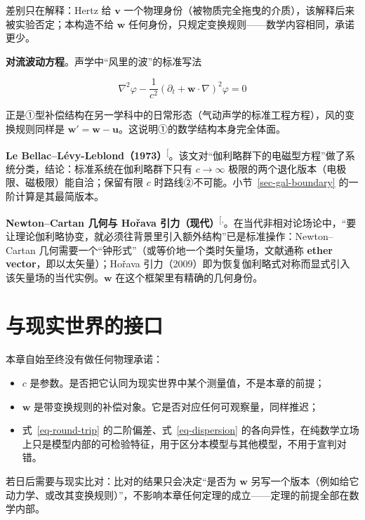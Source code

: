\documentclass[
  chinese,
  a4paper,
  UTF8,
  12pt,
  oneside,
  openany]{ctexbook}
\providecommand{\tightlist}{%
  \setlength{\itemsep}{0pt}\setlength{\parskip}{0pt}}
\theoremstyle{plain}
\theoremstyle{plain}
\theoremstyle{plain}
\theoremstyle{definition}
\theoremstyle{plain}
\theoremstyle{plain}
\theoremstyle{remark}
\begin{document}
差别只在解释：Hertz 给 \(\mathbf{v}\)
一个物理身份（被物质完全拖曳的介质），该解释后来被实验否定；本构造不给
\(\mathbf{w}\) 任何身份，只规定变换规则------数学内容相同，承诺更少。

\textbf{对流波动方程}。声学中``风里的波''的标准写法

\[
\nabla^{2}\varphi - \frac{1}{c^{2}}\left(\partial_{t}+\mathbf{w}\cdot\nabla\right)^{2}\varphi = 0
\]

正是①型补偿结构在另一学科中的日常形态（气动声学的标准工程方程），风的变换规则同样是
\(\mathbf{w}'=\mathbf{w}-\mathbf{u}\)。这说明①的数学结构本身完全体面。

\textbf{Le
Bellac--Lévy-Leblond（1973）}\textsuperscript{{[}\citeproc{ref-lebellac1973}{8}{]}}。该文对``伽利略群下的电磁型方程''做了系统分类，结论：标准系统在伽利略群下只有
\(c\to\infty\) 极限的两个退化版本（电极限、磁极限）能自洽；保留有限
\(c\) 时路线②不可能。小节~\ref{sec-gal-boundary}
的一阶计算是其最简版本。

\textbf{Newton--Cartan 几何与 Hořava
引力（现代）}\textsuperscript{{[},\citeproc{ref-horava2009}{11}{]}}。在当代非相对论场论中，``要让理论伽利略协变，就必须往背景里引入额外结构''已是标准操作：Newton--Cartan
几何需要一个``钟形式''（或等价地一个类时矢量场，文献通称 \textbf{ether
vector}，即以太矢量）；Hořava
引力（2009）即为恢复伽利略式对称而显式引入该矢量场的当代实例。\(\mathbf{w}\)
在这个框架里有精确的几何身份。

\section{与现实世界的接口}\label{sec-gal-interface}

本章自始至终没有做任何物理承诺：

\begin{itemize}
\tightlist
\item
  \(c\) 是参数。是否把它认同为现实世界中某个测量值，不是本章的前提；
\item
  \(\mathbf{w}\)
  是带变换规则的补偿对象。它是否对应任何可观察量，同样推迟；
\item
  式~\ref{eq-round-trip} 的二阶偏差、式~\ref{eq-dispersion}
  的各向异性，在纯数学立场上只是模型内部的可检验特征，用于区分本模型与其他模型，不用于宣判对错。
\end{itemize}

若日后需要与现实比对：比对的结果只会决定``是否为 \(\mathbf{w}\)
另写一个版本（例如给它动力学、或改其变换规则）''，不影响本章任何定理的成立------定理的前提全部在数学内部。
\end{document}
